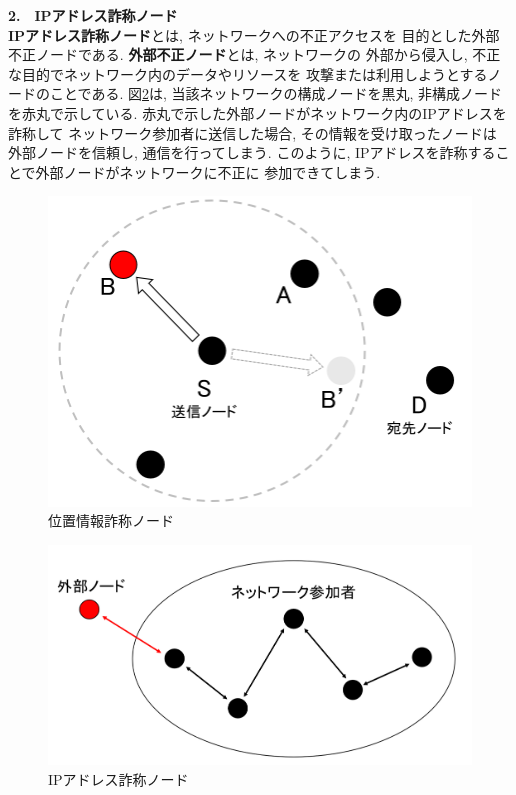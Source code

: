 \noindent \textbf{2.　IPアドレス詐称ノード}\\
\indent \textbf{IPアドレス詐称ノード}とは, ネットワークへの不正アクセスを
目的とした外部不正ノードである. \textbf{外部不正ノード}とは, ネットワークの
外部から侵入し, 不正な目的でネットワーク内のデータやリソースを
攻撃または利用しようとするノードのことである. 図\ref{fig:ip-liar}は,  
当該ネットワークの構成ノードを黒丸, 非構成ノードを赤丸で示している. 
赤丸で示した外部ノードがネットワーク内のIPアドレスを詐称して
ネットワーク参加者に送信した場合, その情報を受け取ったノードは
外部ノードを信頼し, 通信を行ってしまう. このように, 
IPアドレスを詐称することで外部ノードがネットワークに不正に
参加できてしまう. 
\newpage
\begin{figure}
  \centering
  \includegraphics[scale=0.6]{figures/position-liar.png}
  \caption{位置情報詐称ノード}
  \label{fig:position-liar}
\end{figure}

\begin{figure}
  \centering
  \includegraphics[scale=0.6]{figures/ip-liar.png}
  \caption{IPアドレス詐称ノード}
  \label{fig:ip-liar}
\end{figure}

